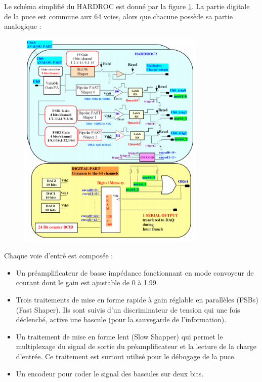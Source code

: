 Le schéma simplifié du HARDROC est donné par la figure \ref{scheme}. La partie digitale de la puce est commune aux 64 voies, alors que chacune possède sa partie analogique :
\begin{figure}[ht!]
	\centering
	\includegraphics[width=0.8\textwidth]{GLA/scheme.png}
	\label{scheme}
\end{figure}

Chaque voie d'entré est composée :
\begin{itemize}[label=$\bullet$]
	\item Un préamplificateur de basse impédance fonctionnant en mode convoyeur de courant dont le gain est ajustable de 0 à 1.99.
	\item Trois traitements de mise en forme rapide à gain réglable en parallèles (FSBs) (Fast Shaper). Ils sont suivis d'un discriminateur de tension qui une fois déclenché, active une bascule (pour la sauvegarde de l'information).
	\item Un traitement de mise en forme lent (Slow Shapper) qui permet le multiplexage du signal de sortie du préamplificateur et la lecture de la charge d'entrée. Ce traitement est surtout utilisé pour le débogage de la puce.
	\item Un encodeur pour coder le signal des bascules sur deux bits.
\end{itemize}

